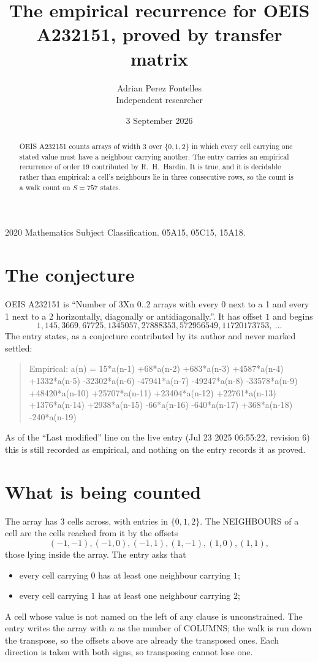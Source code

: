 \documentclass[11pt,a4paper]{article}
\title{The empirical recurrence for OEIS A232151, proved by transfer matrix}
\author{Adrian Perez Fontelles\\ \small Independent researcher}
\date{3 September 2026}
\theoremstyle{plain}
\theoremstyle{definition}
\begin{document}
\maketitle

\begin{abstract}
OEIS A232151 counts arrays of width $3$ over $\{0,1,2\}$ in which every cell carrying one stated
value must have a neighbour carrying another. The entry carries an empirical recurrence of
order $19$ contributed by R.~H.~Hardin. It is true, and it is decidable rather than
empirical: a cell's neighbours lie in three consecutive rows, so the count is a walk count on
$S=757$ states.
\end{abstract}

\noindent\small 2020 Mathematics Subject Classification. 05A15, 05C15, 15A18.\normalsize

\section{The conjecture}

OEIS A232151 is ``Number of 3Xn 0..2 arrays with every 0 next to a 1 and every 1 next to a 2 horizontally, diagonally or antidiagonally.''. It has offset $1$ and begins
\[
1, 145, 3669, 67725, 1345057, 27888353, 572956549, 11720173753,\ \dots
\]
The entry states, as a conjecture contributed by its author and never marked settled:
\begin{quote}
Empirical: a(n) = 15*a(n-1) +68*a(n-2) +683*a(n-3) +4587*a(n-4) +1332*a(n-5) -32302*a(n-6) -47941*a(n-7) -49247*a(n-8) -33578*a(n-9) +48420*a(n-10) +25707*a(n-11) +23404*a(n-12) +22761*a(n-13) +1376*a(n-14) +2938*a(n-15) -66*a(n-16) -640*a(n-17) +368*a(n-18) -240*a(n-19)
\end{quote}
As of the ``Last modified'' line on the live entry (Jul 23 2025 06:55:22, revision 6) this is still
recorded as empirical, and nothing on the entry records it as proved.

\section{What is being counted}

The array has $3$ cells across, with entries in $\{0,1,2\}$. The NEIGHBOURS of a cell are the
cells reached from it by the offsets
\[
(-1,-1), (-1,0), (-1,1), (1,-1), (1,0), (1,1),
\]
those lying inside the array. The entry asks that
\begin{itemize}
\item every cell carrying $0$ has at least one neighbour carrying $1$;
\item every cell carrying $1$ has at least one neighbour carrying $2$;

\end{itemize}
A cell whose value is not named on the left of any clause is unconstrained. The entry writes the array with $n$ as the number of COLUMNS; the walk is run down the transpose, so the offsets above are already the transposed ones. Each direction is taken with both signs, so transposing cannot lose one.
\end{document}
